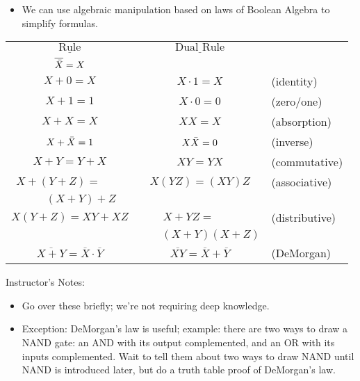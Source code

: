 \begin{frame}[fragile]
\begin{itemize}
\item We can use algebraic manipulation based on laws of Boolean Algebra to simplify formulas.
\end{itemize}

		\begin{center}
		\begin{tabular}{ccl}
		$\underline{\mbox{~~~Rule~~~}}$	& $\underline{\mbox{~~~Dual Rule~~~}}$ \\
		$\overline{\Bar{X}} = X$ & \\
		$X+0=X$	& $X\cdot 1 = X$& (identity)\\
		$X+1=1$	& $X\cdot 0 = 0$& (zero/one)\\
		$X+X=X$	& $XX = X$ & (absorption)\\
		$X+\Bar{X}=1$ &$X\Bar{X} = 0$ & (inverse)\\
		$X+Y=Y+X$ & $XY = YX$&(commutative)\\
		$X+(Y+Z)=\qquad$ & $X(YZ) = (XY)Z$ & (associative)\\
		$\qquad (X+Y)+Z$ &\\
		$X(Y+Z) = XY+XZ$ & $X+YZ = \qquad$ & (distributive)\\
				& $\qquad (X+Y)(X+Z)$\\
		$\overline{X+Y}=\overline{X}\cdot\overline{Y}$ & $\overline{XY} = \overline{X}+\overline{Y}$
							& (DeMorgan)
		\end{tabular}
		\end{center}

\end{frame}
\BNotes\ifnum{}
\begin{frame}[fragile]
Instructor's Notes:
\begin{itemize}
\item Go over these briefly; we're not requiring deep knowledge.
\item Exception: DeMorgan's law is useful; example: there are two ways
	to draw a NAND gate: an AND with its output complemented, and an OR
	with its inputs complemented.  Wait to tell them about two ways to
	draw NAND until NAND is introduced later, but do a truth table proof
	of DeMorgan's law.
\end{itemize}
\end{frame}
\fi\ENotes

